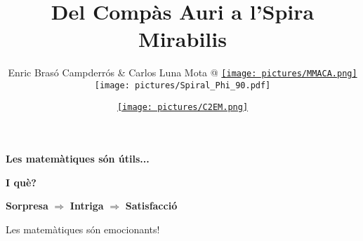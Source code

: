 \documentclass[14pt]{beamer}
\title{\large Del Compàs Auri a l'Spira Mirabilis\\[-2ex]}
\author{{\small Enric Brasó Campderrós \& Carlos Luna Mota @ \href{https://mmaca.cat/}{\texttt{[image: pictures/MMACA.png]}}}\\[2ex]
        \texttt{[image: pictures/Spiral\_Phi\_90.pdf]}\\[-4ex]}
\date{\href{https://c2em.feemcat.org/}{\texttt{[image: pictures/C2EM.png]}}}
\begin{document}

    \begin{frame}
      \titlepage
    \end{frame}


    \begin{frame}{}
        \begin{center}
            \bigskip
            
            \textbf{\Large Les matemàtiques són útils...}

            \bigskip \bigskip \bigskip \bigskip
            
            \textbf{\Huge I què?}
        \end{center}
    \end{frame}


    \begin{frame}{}
        \begin{center}
            {\Large \textbf{Sorpresa} $\Rightarrow$ \textbf{Intriga} $\Rightarrow$ \textbf{Satisfacció}}

            {\Large \bigskip \bigskip \bigskip \bigskip

            {Les matemàtiques són emocionants!}}
        \end{center}
    \end{frame}


    {
    \begin{frame}[plain]
    \end{frame}
    }


    {
    \begin{frame}[plain]
    \end{frame}
    }


    {
    \begin{frame}[plain]
    \end{frame}
    }
\end{document}
